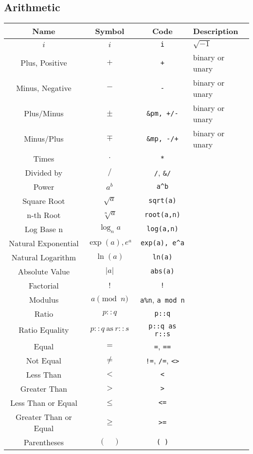 \documentclass{article}
\begin{document}
  \subsection{Arithmetic} %
  \label{sub:arithmetic}
  \begin{table}[!h]
    \centering
    \begin{tabular}{|c|c|c|l|}
      \hline
      \textbf{Name} & \textbf{Symbol} & \textbf{Code} & \textbf{Description} \\
      \hline\hline
      \( i \) & \( i \) & \texttt{i} & \( \sqrt{-1} \)\\
      Plus, Positive & \( + \) & \texttt{+} & binary or unary\\
      Minus, Negative & \( - \) & \texttt{-} & binary or unary\\
      Plus/Minus & \( \pm \) & \texttt{\&pm, +/-} & binary or unary\\
      Minus/Plus & \( \mp \) & \texttt{\&mp, -/+} & binary or unary\\
      Times & \( \cdot \) & \texttt{*} & \\
      Divided by & \( / \) & \texttt{/}, \texttt{\&/} & \\
      Power & \( a^b \) & \texttt{a\^{}b} & \\
      Square Root & \( \sqrt{a} \) & \texttt{sqrt(a)} & \\
      n-th Root & \( \sqrt[n]{a} \) & \texttt{root(a,n)} & \\
      Log Base n & \( \log_n{a} \) & \texttt{log(a,n)} & \\
      Natural Exponential & \( \exp(a), e^a \) & \texttt{exp(a), e\^{}a} & \\
      Natural Logarithm & \( \ln(a) \) & \texttt{ln(a)} & \\
      Absolute Value & \( \left| a \right| \) & \texttt{abs(a)} & \\
      Factorial & \( ! \) & \texttt{!} & \\
      Modulus & \( a \pmod{n} \) & \texttt{a\%n}, \texttt{a mod n} & \\
      \hline
      Ratio & \( p::q \) & \texttt{p::q} & \\
      Ratio Equality & \( p::q ~\mathrm{as}~ r::s \) & \texttt{p::q as r::s} & \\
      \hline
      Equal & \( = \) & \texttt{=}, \texttt{==} & \\
      Not Equal & \( \ne \) & \texttt{!=}, \texttt{/=}, \texttt{<>} & \\
      Less Than & \( < \) & \texttt{<} & \\
      Greater Than & \( > \) & \texttt{>} & \\
      Less Than or Equal & \( \le \) & \texttt{<=} & \\
      Greater Than or Equal & \( \ge \) & \texttt{>=} & \\
      Parentheses & \( ( \quad ) \) & \texttt{( )} & \\
      \hline
    \end{tabular}
  \end{table}
\end{document}
